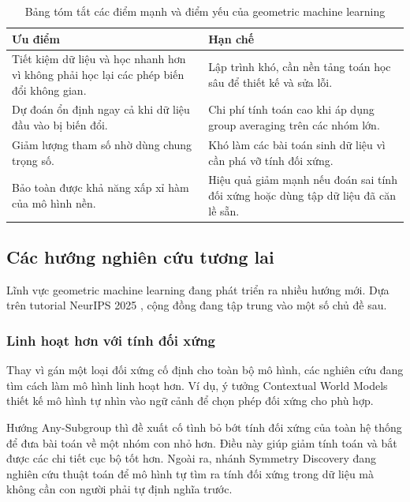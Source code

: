 \begin{table}[H]
    \centering
    \caption[Tóm tắt ưu nhược điểm của geometric machine learning]{Bảng tóm tắt các điểm mạnh và điểm yếu của geometric machine learning}
    \label{tab:uu-nhuoc-diem}
    \small
    \renewcommand{\arraystretch}{1.3}
    \begin{tabular}{p{}p{}}
        \toprule
        \rowcolor{gray!20}
        \textbf{Ưu điểm} & \textbf{Hạn chế} \\
        \midrule
        Tiết kiệm dữ liệu và học nhanh hơn vì không phải học lại các phép biến đổi không gian. & Lập trình khó, cần nền tảng toán học sâu để thiết kế và sửa lỗi. \\
        Dự đoán ổn định ngay cả khi dữ liệu đầu vào bị biến đổi. & Chi phí tính toán cao khi áp dụng group averaging trên các nhóm lớn. \\
        Giảm lượng tham số nhờ dùng chung trọng số. & Khó làm các bài toán sinh dữ liệu vì cần phá vỡ tính đối xứng. \\
        Bảo toàn được khả năng xấp xỉ hàm của mô hình nền. & Hiệu quả giảm mạnh nếu đoán sai tính đối xứng hoặc dùng tập dữ liệu đã căn lề sẵn. \\
        \bottomrule
    \end{tabular}
\end{table}

\subsection{Các hướng nghiên cứu tương lai}
\label{subsec:huong-nghien-cuu}

Lĩnh vực geometric machine learning đang phát triển ra nhiều hướng mới. Dựa trên tutorial NeurIPS 2025 \cite{jegelka2025tutorial}, cộng đồng đang tập trung vào một số chủ đề sau.

\subsubsection{Linh hoạt hơn với tính đối xứng}

Thay vì gán một loại đối xứng cố định cho toàn bộ mô hình, các nghiên cứu đang tìm cách làm mô hình linh hoạt hơn. Ví dụ, ý tưởng Contextual World Models \cite{gupta2024contextual} thiết kế mô hình tự nhìn vào ngữ cảnh để chọn phép đối xứng cho phù hợp. 

Hướng Any-Subgroup \cite{goel2025anysubgroup} thì đề xuất cố tình bỏ bớt tính đối xứng của toàn hệ thống để đưa bài toán về một nhóm con nhỏ hơn. Điều này giúp giảm tính toán và bắt được các chi tiết cục bộ tốt hơn. Ngoài ra, nhánh Symmetry Discovery đang nghiên cứu thuật toán để mô hình tự tìm ra tính đối xứng trong dữ liệu mà không cần con người phải tự định nghĩa trước.


